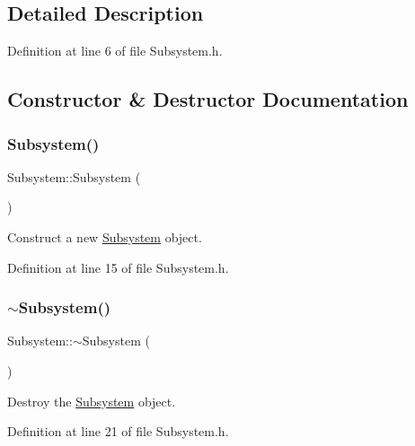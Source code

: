 \subsection{Detailed Description}


Definition at line 6 of file Subsystem.\+h.



\subsection{Constructor \& Destructor Documentation}
\mbox{\label{class_subsystem_abdec44abe9ddba76f65abb02f8f62992}} 
\subsubsection{\texorpdfstring{Subsystem()}{Subsystem()}}
{\footnotesize\ttfamily Subsystem\+::\+Subsystem (\begin{DoxyParamCaption}{ }\end{DoxyParamCaption})\hspace{0.3cm}{\ttfamily [inline]}}



Construct a new \mbox{\hyperlink{class_subsystem}{Subsystem}} object. 



Definition at line 15 of file Subsystem.\+h.

\mbox{\label{class_subsystem_af6026d0c678986cf1626251bf38916fa}} 
\subsubsection{\texorpdfstring{$\sim$Subsystem()}{~Subsystem()}}
{\footnotesize\ttfamily Subsystem\+::$\sim$\+Subsystem (\begin{DoxyParamCaption}{ }\end{DoxyParamCaption})\hspace{0.3cm}{\ttfamily [inline]}}



Destroy the \mbox{\hyperlink{class_subsystem}{Subsystem}} object. 



Definition at line 21 of file Subsystem.\+h.



